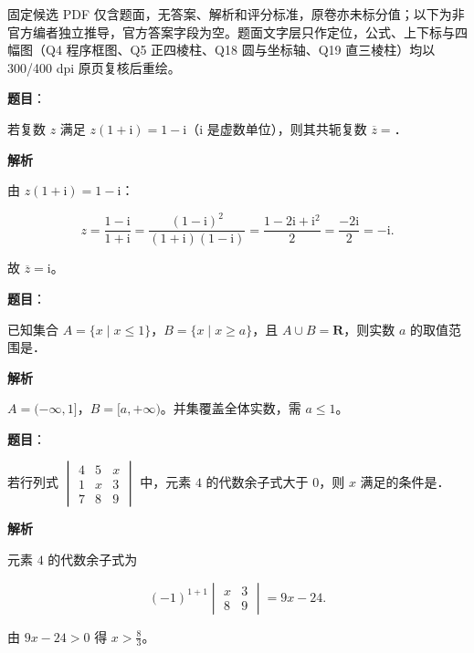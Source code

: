 

\begin{gktip}
固定候选 PDF 仅含题面，无答案、解析和评分标准，原卷亦未标分值；以下为非官方编者独立推导，官方答案字段为空。题面文字层只作定位，公式、上下标与四幅图（Q4 程序框图、Q5 正四棱柱、Q18 圆与坐标轴、Q19 直三棱柱）均以 300/400 dpi 原页复核后重绘。
\end{gktip}

\begin{answer}

\textbf{题目}：

若复数 $z$ 满足 $z(1+\mathrm i)=1-\mathrm i$（$\mathrm i$ 是虚数单位），则其共轭复数 $\overline z=$\gkblank{}．

\textbf{解析}

由 $z(1+\mathrm i)=1-\mathrm i$：

\nopagebreak[4]
\[z=\frac{1-\mathrm i}{1+\mathrm i}=\frac{(1-\mathrm i)^2}{(1+\mathrm i)(1-\mathrm i)}=\frac{1-2\mathrm i+\mathrm i^2}{2}=\frac{-2\mathrm i}{2}=-\mathrm i .\]

故 $\overline z=\mathrm i$。


\end{answer}
\begin{answer}

\textbf{题目}：

已知集合 $A=\{x\mid x\leqslant1\}$，$B=\{x\mid x\geqslant a\}$，且 $A\cup B=\mathbf R$，则实数 $a$ 的取值范围是\gkblank{}．

\textbf{解析}

$A=(-\infty,1]$，$B=[a,+\infty)$。并集覆盖全体实数，需 $a\leqslant1$。


\end{answer}
\begin{answer}

\textbf{题目}：

若行列式 $\begin{vmatrix}4&5&x\\1&x&3\\7&8&9\end{vmatrix}$ 中，元素 $4$ 的代数余子式大于 $0$，则 $x$ 满足的条件是\gkblank{}．

\textbf{解析}

元素 $4$ 的代数余子式为

\nopagebreak[4]
\[(-1)^{1+1}\begin{vmatrix}x&3\\8&9\end{vmatrix}=9x-24 .\]

由 $9x-24>0$ 得 $x>\frac83$。


\end{answer}
